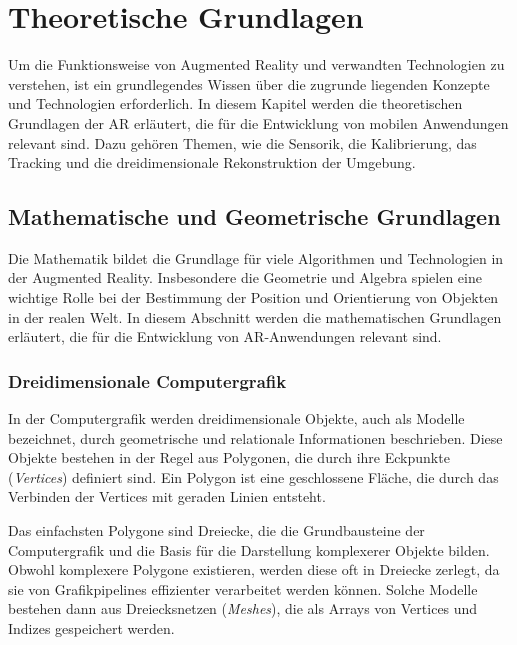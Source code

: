 \chapter{Theoretische Grundlagen}

Um die Funktionsweise von Augmented Reality und verwandten Technologien zu verstehen, ist ein grundlegendes Wissen über die zugrunde liegenden Konzepte und Technologien erforderlich. In diesem Kapitel werden die theoretischen Grundlagen der AR erläutert, die für die Entwicklung von mobilen Anwendungen relevant sind. Dazu gehören Themen, wie die Sensorik, die Kalibrierung, das Tracking und die dreidimensionale Rekonstruktion der Umgebung. \cite{doerner2022virtual}

\section{Mathematische und Geometrische Grundlagen}

Die Mathematik bildet die Grundlage für viele Algorithmen und Technologien in der Augmented Reality. Insbesondere die Geometrie und Algebra spielen eine wichtige Rolle bei der Bestimmung der Position und Orientierung von Objekten in der realen Welt. In diesem Abschnitt werden die mathematischen Grundlagen erläutert, die für die Entwicklung von AR-Anwendungen relevant sind.

\subsection{Dreidimensionale Computergrafik}

In der Computergrafik werden dreidimensionale Objekte, auch als Modelle bezeichnet, durch geometrische und relationale Informationen beschrieben. Diese Objekte bestehen in der Regel aus Polygonen, die durch ihre Eckpunkte (\textit{Vertices}) definiert sind. Ein Polygon ist eine geschlossene Fläche, die durch das Verbinden der Vertices mit geraden Linien entsteht. \cite{wikipedia2023polygons, espinoza2024graphics}

Das einfachsten Polygone sind Dreiecke, die die Grundbausteine der Computergrafik und die Basis für die Darstellung komplexerer Objekte bilden. Obwohl komplexere Polygone existieren, werden diese oft in Dreiecke zerlegt, da sie von Grafikpipelines effizienter verarbeitet werden können. Solche Modelle bestehen dann aus Dreiecksnetzen (\textit{Meshes}), die als Arrays von Vertices und Indizes gespeichert werden. \cite{wikipedia2023polygons, espinoza2024graphics}

